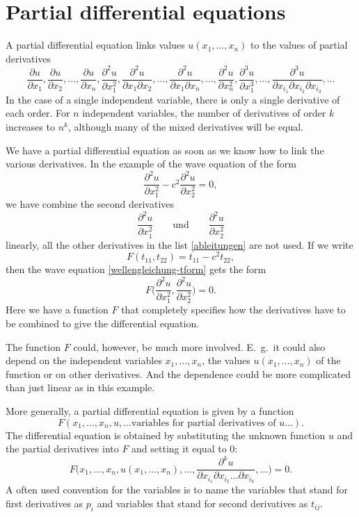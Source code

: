 %
%
%
\section{Partial differential equations%
\label{klassifikation:differentialgleichungen}}
A partial differential equation links values 
$u(x_1,\dots,x_n)$
to the values of partial derivatives
\begin{equation}
\frac{\partial u}{\partial x_1},
\frac{\partial u}{\partial x_2},
\dots,
\frac{\partial u}{\partial x_n},
\frac{\partial^2 u}{\partial x_1^2},
\frac{\partial^2 u}{\partial x_1\partial x_2},\dots,
\frac{\partial^2 u}{\partial x_1\partial x_n},\dots,
\frac{\partial^2 u}{\partial x_n^2},
\frac{\partial^3 u}{\partial x_1^3},\dots,
\frac{\partial^3 u}{\partial x_{i_1}\partial x_{i_2}\partial x_{i_3}},\dots
\label{ableitungen}
\end{equation}
In the case of a single independent variable, there is only a single
derivative of each order.
For $n$ independent variables, the number of derivatives of order $k$
increases to $n^k$, although many of the mixed derivatives will be
equal.

We have a partial differential equation as soon as we know how to
link the various derivatives.
In the example of the wave equation of the form
\begin{equation}
\frac{\partial^2 u}{\partial x_1^2}
-
c^2\frac{\partial^2 u}{\partial x_2^2} = 0,
\label{wellengleichung-tform}
\end{equation}
we have combine the second derivatives 
\[
\frac{\partial^2 u}{\partial x_1^2}
\qquad
\text{und}
\qquad
\frac{\partial^2 u}{\partial x_2^2}
\]
linearly, all the other derivatives in the list
\eqref{ableitungen}
are not used.
If we write
\[
F(t_{11}, t_{22}) = t_{11} -c^2t_{22},
\]
then the wave equation
\eqref{wellengleichung-tform}
gets the form
\[
F\biggl(
\frac{\partial^2 u}{\partial x_1^2},
\frac{\partial^2 u}{\partial x_2^2}
\biggr)=0.
\]
Here we have a function $F$ that completely specifies how the
derivatives have to be combined to give the differential equation.

The function $F$ could, however, be much more involved.
E.~g.~it could also depend on the independent variables
$x_1,\dots,x_n$, the values $u(x_1,\dots,x_n)$ of the function
or on other derivatives.
And the dependence could be more complicated than just linear as
in this example.

More generally, a partial differential equation is given by a function
\[
F(x_1,\dots,x_n,u,\dots\text{variables for partial derivatives of $u$}\dots).
\]
The differential equation is obtained by substituting the unknown function $u$
and the partial derivatives into $F$ and setting it equal to $0$:
\[
F\biggl(x_1,\dots,x_n,u(x_1,\dots,x_n),\dots,
\frac{\partial^k u}{\partial x_{i_1}\partial x_{i_2}\dots \partial x_{i_k}},\dots\biggr)=0.
\]
A often used convention for the variables is to name the variables that
stand for first derivatives as $p_i$ and variables that stand for second
derivatives as $t_{ij}$.

